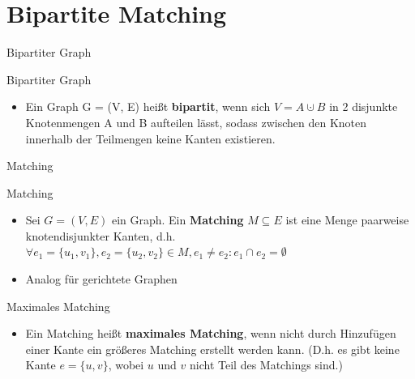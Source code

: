 \documentclass[18pt]{beamer}
\begin{document}
\section{Bipartite Matching}
\begin{frame}{Bipartiter Graph}
\begin{block}{Bipartiter Graph}
\begin{itemize}
\item Ein Graph G = (V, E) hei{\ss}t \textbf{bipartit}, wenn sich $V = A \cupdot B$ in 2 disjunkte Knotenmengen A und B aufteilen l\"asst,
sodass zwischen den Knoten innerhalb der Teilmengen keine Kanten existieren.
\end{itemize}
\end{block}

\begin{center}
\end{center}
\end{frame}

\begin{frame}{Matching}
\begin{block}{Matching}
\begin{itemize}
\item Sei $G = (V, E)$ ein Graph. Ein \textbf{Matching} $M \subseteq E$ ist eine Menge paarweise knotendisjunkter Kanten,
d.h. $\forall e_{1} = \{u_{1}, v_{1}\}, e_{2} = \{u_{2}, v_{2}\} \in M, e_{1} \neq e_{2}: e_{1} \cap e_{2} = \emptyset$
\item Analog f\"ur gerichtete Graphen
\end{itemize}
\end{block}

\pause

\begin{block}{Maximales Matching}
\begin{itemize}
\item Ein Matching hei{\ss}t \textbf{maximales Matching}, wenn nicht durch Hinzuf\"ugen einer Kante ein gr\"o{\ss}eres Matching erstellt werden kann.
(D.h. es gibt keine Kante $e = \{u, v\}$, wobei $u$ und $v$ nicht Teil des Matchings sind.)
\end{itemize}
\end{block}
\end{frame}
\end{document}
